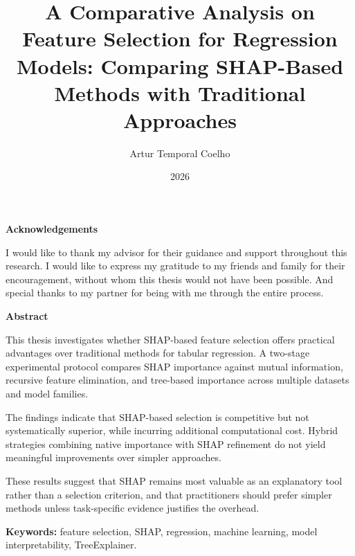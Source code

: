 \documentclass[12pt]{report}
\title{A Comparative Analysis on Feature Selection for Regression Models: Comparing SHAP-Based Methods with Traditional Approaches}
\author{Artur Temporal Coelho}
\date{2026}
\begin{document}



\begin{center}
\LARGE
\textbf{Acknowledgements}
\end{center}

I would like to thank my advisor for their guidance and support throughout this research. I would like to express my gratitude to my friends and family for their encouragement, without whom this thesis would not have been possible. And special thanks to my partner for being with me through the entire process.

\newpage

\begin{center}
\LARGE
\textbf{Abstract}
\end{center}

This thesis investigates whether SHAP-based feature selection offers practical advantages over traditional methods for tabular regression. A two-stage experimental protocol compares SHAP importance against mutual information, recursive feature elimination, and tree-based importance across multiple datasets and model families.

The findings indicate that SHAP-based selection is competitive but not systematically superior, while incurring additional computational cost. Hybrid strategies combining native importance with SHAP refinement do not yield meaningful improvements over simpler approaches.

These results suggest that SHAP remains most valuable as an explanatory tool rather than a selection criterion, and that practitioners should prefer simpler methods unless task-specific evidence justifies the overhead.

\vspace{0.5cm}

\textbf{Keywords:} feature selection, SHAP, regression, machine learning, model interpretability, TreeExplainer.

\newpage

\tableofcontents
\newpage

\listoffigures
\listoftables
\newpage








\end{document}
